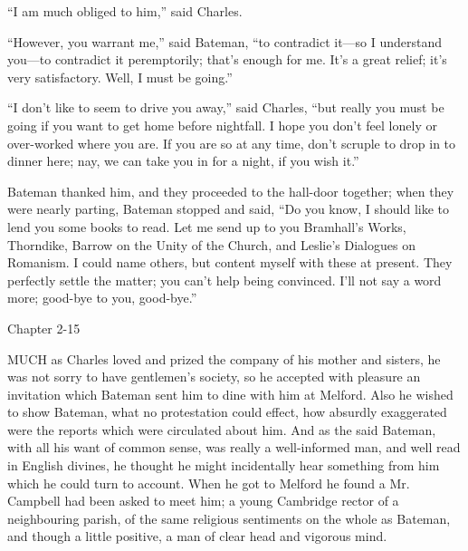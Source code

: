 ``I am much obliged to him,'' said Charles.

``However, you warrant me,'' said Bateman, ``to contradict
it—so I understand you—to contradict it peremptorily; that's
enough for me. It's a great relief; it's very satisfactory. Well, I
must be going.''

``I don't like to seem to drive you away,'' said Charles,
``but really you must be going if you want to get home before
nightfall. I hope you don't feel lonely or over-worked where you are.
If you are so at any time, don't scruple to drop in to dinner here;
nay, we can take you in for a night, if you wish it.''

Bateman thanked him, and they proceeded to the hall-door together;
when they were nearly parting, Bateman stopped and said, ``Do you
know, I should like to lend you some books to read. Let me send up to
you Bramhall's Works, Thorndike, Barrow on the Unity of the Church,
and Leslie's Dialogues on Romanism. I could name others, but content
myself with these at present. They perfectly settle the matter; you
can't help being convinced. I'll not say a word more; good-bye to you,
good-bye.''

Chapter 2-15


MUCH as Charles loved and prized the
company of his mother and sisters, he was not sorry to have gentlemen's
society, so he accepted with pleasure an invitation which Bateman sent
him to dine with him at Melford. Also he wished to show Bateman, what
no protestation could effect, how absurdly exaggerated were the
reports which were circulated about him. And as the said Bateman, with
all his want of common sense, was really a well-informed man, and well
read in English divines, he thought he might incidentally hear
something from him which he could turn to account. When he got to
Melford he found a Mr. Campbell had been asked to meet him; a young
Cambridge rector of a neighbouring parish, of the same religious
sentiments on the whole as Bateman, and though a little positive, a
man of clear head and vigorous mind.

